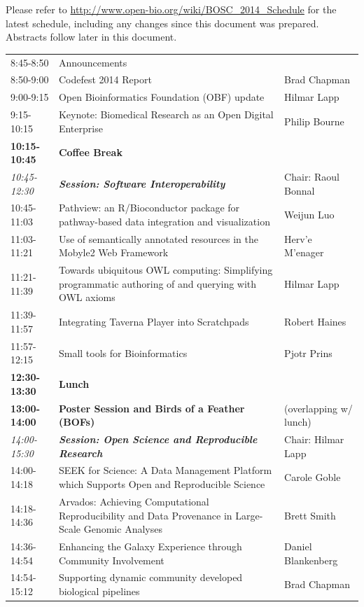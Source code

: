 \documentclass[12pt,oneside]{article}
\begin{document}
Please refer to \url{http://www.open-bio.org/wiki/BOSC_2014_Schedule} for the
latest schedule, including any changes since this document was prepared.
Abstracts follow later in this document.

\begin{center}
\begin{tabular}{|p{2.4cm}|p{10cm}|p{4.2cm}|}
\hline
8:45-8:50 & Announcements & \\
8:50-9:00 & Codefest 2014 Report & Brad Chapman\\
9:00-9:15 & Open Bioinformatics Foundation (OBF) update & Hilmar Lapp\\
9:15-10:15 & Keynote: Biomedical Research as an Open Digital Enterprise & Philip Bourne\\
\hline
\textbf{10:15-10:45} & \textbf{Coffee Break} & \\
\hline
\textit{10:45-12:30} & \textbf{\textit{Session: Software Interoperability}} & Chair: Raoul Bonnal\\
10:45-11:03 & Pathview: an R/Bioconductor package for pathway-based data integration and visualization & Weijun Luo\\
11:03-11:21 & Use of semantically annotated resources in the Mobyle2 Web Framework & Herv{'e} M{'e}nager\\
11:21-11:39 & Towards ubiquitous OWL computing: Simplifying programmatic authoring of and querying with OWL axioms & Hilmar Lapp\\
11:39-11:57 & Integrating Taverna Player into Scratchpads & Robert Haines\\
11:57-12:15 & Small tools for Bioinformatics & Pjotr Prins\\
\hline
\textbf{12:30-13:30} & \textbf{Lunch} &\\
\textbf{13:00-14:00} & \textbf{Poster Session and Birds of a Feather (BOFs)} &  (overlapping w/ lunch)\\
\hline
\textit{14:00-15:30} & \textbf{\textit{Session: Open Science and Reproducible Research}} & Chair: Hilmar Lapp\\
14:00-14:18 & SEEK for Science: A Data Management Platform which Supports Open and Reproducible Science & Carole Goble\\
14:18-14:36 & Arvados: Achieving Computational Reproducibility and Data Provenance in Large-Scale Genomic Analyses & Brett Smith\\
14:36-14:54 & Enhancing the Galaxy Experience through Community Involvement & Daniel Blankenberg\\
14:54-15:12 & Supporting dynamic community developed biological pipelines & Brad Chapman\\

\end{tabular}
\end{center}
\end{document}

